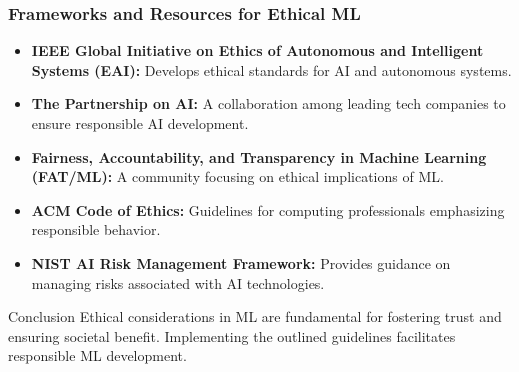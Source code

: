 \documentclass[aspectratio=169]{beamer}
\begin{document}
\begin{frame}[fragile]
    \frametitle{Frameworks and Resources for Ethical ML}
    \begin{itemize}
        \item \textbf{IEEE Global Initiative on Ethics of Autonomous and Intelligent Systems (EAI):} 
        Develops ethical standards for AI and autonomous systems.
        
        \item \textbf{The Partnership on AI:} 
        A collaboration among leading tech companies to ensure responsible AI development.
        
        \item \textbf{Fairness, Accountability, and Transparency in Machine Learning (FAT/ML):} 
        A community focusing on ethical implications of ML.
        
        \item \textbf{ACM Code of Ethics:} 
        Guidelines for computing professionals emphasizing responsible behavior.
        
        \item \textbf{NIST AI Risk Management Framework:} 
        Provides guidance on managing risks associated with AI technologies.
    \end{itemize}

    \begin{block}{Conclusion}
        Ethical considerations in ML are fundamental for fostering trust and ensuring societal benefit. Implementing the outlined guidelines facilitates responsible ML development.
    \end{block}
\end{frame}
\end{document}
